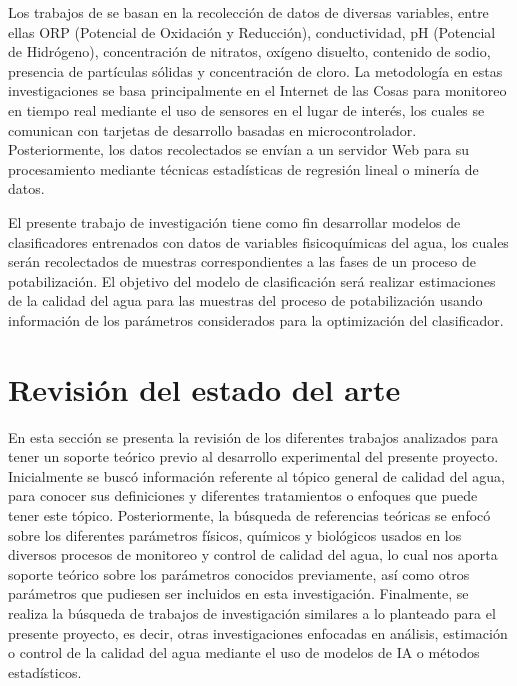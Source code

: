 Los trabajos de \cite{ramadhan_smart_2020} \cite{saetta_datamining_2021} \cite{mamun_smart_2019} se basan en la recolección de datos de diversas
variables, entre ellas ORP (Potencial de Oxidación y Reducción), conductividad,
pH (Potencial de Hidrógeno), concentración de nitratos, oxígeno disuelto, contenido 
de sodio, presencia de partículas sólidas y concentración de cloro. La metodología en estas investigaciones
se basa principalmente en el Internet de las Cosas para monitoreo en 
tiempo real mediante el uso de sensores en el lugar de interés, los cuales se
comunican con tarjetas de desarrollo basadas en microcontrolador.
Posteriormente, los datos recolectados se envían a un servidor Web para su 
procesamiento mediante técnicas estadísticas de regresión lineal o minería de datos.

El presente trabajo de investigación tiene como fin desarrollar modelos
de clasificadores entrenados con datos de variables 
fisicoquímicas del agua, los cuales serán recolectados de muestras correspondientes
a las fases de un proceso de potabilización. El objetivo del modelo de clasificación será realizar estimaciones de la calidad del agua para las muestras del proceso de potabilización usando información de los parámetros 
considerados para la optimización del clasificador.



\section{Revisión del estado del arte}

En esta sección se presenta la revisión de los diferentes trabajos analizados para tener un soporte teórico previo al desarrollo experimental del presente proyecto. Inicialmente se buscó información referente al tópico general 
de calidad del agua, para conocer sus definiciones y diferentes tratamientos o enfoques que puede tener este tópico. Posteriormente, la búsqueda de referencias teóricas se enfocó sobre los diferentes parámetros físicos, 
químicos y biológicos usados en los diversos procesos de monitoreo y control de calidad del agua, lo cual nos aporta soporte teórico sobre los parámetros conocidos previamente, así como otros parámetros que pudiesen ser 
incluidos en esta investigación. Finalmente, se realiza la búsqueda de trabajos de investigación similares a lo planteado para el presente proyecto, es decir, otras investigaciones enfocadas en análisis, estimación o control 
de la calidad del agua mediante el uso de modelos de IA o métodos estadísticos.


